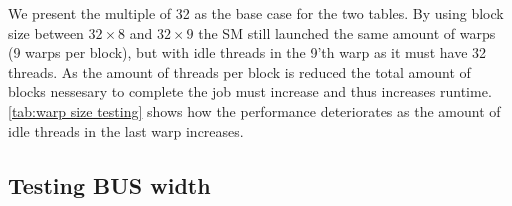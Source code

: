We present the multiple of 32 as the base case for the two tables.
By using block size between $32 \times 8$ and $32 \times 9$ the SM still launched the same amount of warps (9 warps per block), but with idle threads in the 9'th warp as it must have 32 threads.
As the amount of threads per block is reduced the total amount of blocks nessesary to complete the job must increase and thus increases runtime.
\cref{tab:warp size testing} shows how the performance deteriorates as the amount of idle threads in the last warp increases.

\subsection{Testing BUS width}
\label{sec:testing BUS width}


